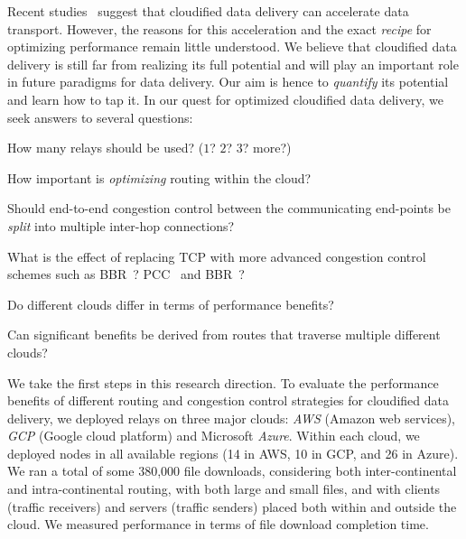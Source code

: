 \documentclass{hotnets17}
\begin{document}
Recent studies~\cite{cgn2017,CRONets,wang2013accelerating} suggest that cloudified data delivery can accelerate data transport. However, the reasons for this acceleration and the exact \textit{recipe} for optimizing performance remain little understood. We believe that cloudified data delivery is still far from realizing its full potential and will play an important role in future paradigms for data delivery. Our aim is hence to \emph{quantify} its potential and learn how to tap it. In our quest for optimized cloudified data delivery, we seek answers to several questions: 
\begin{inlinelist}
    \item How many relays should be used? ($1$? $2$? $3$? more?)
    \item How important is \emph{optimizing} routing within the cloud?
    \item Should end-to-end congestion control between the communicating end-points be \emph{split} into multiple inter-hop connections?
    \item What is the effect of replacing TCP with more advanced congestion control schemes such as 
    \ifblind BBR~\cite{BBR}? \else
    PCC~\cite{PCC} and BBR~\cite{BBR}? \fi %
    \item Do different clouds differ in terms of performance benefits?
    \item Can significant benefits be derived from routes that traverse multiple different clouds? %
\end{inlinelist}

We take the first steps in this research direction. To evaluate the performance benefits of different routing and congestion control strategies for cloudified data delivery, we deployed relays on three major clouds: \textit{AWS} (Amazon web services), \textit{GCP} (Google cloud platform) and Microsoft \textit{Azure}. Within each cloud, we deployed nodes in all available regions  (14 in AWS, 10 in GCP, and 26 in Azure). We ran a total of some 380,000 file downloads, considering both inter-continental and intra-continental routing, with both large and small files, and with clients (traffic receivers) and servers (traffic senders) placed both within and outside the cloud. We measured performance in terms of file download completion time.
\end{document}
